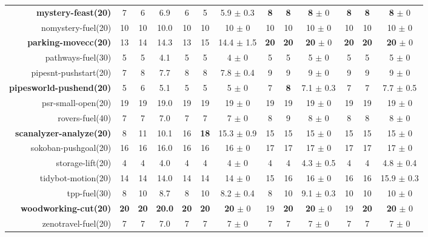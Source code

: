 \begin{center}
\begin{tabular}{|r|*{4}{ccc|}}
\textbf{mystery-feast(20)} & 7 & 6 & 6.9 & 6 & 5 & 5.9 \(\pm\) 0.3 & \textbf{8} & \textbf{8} & \textbf{8} \(\pm\) 0 & \textbf{8} & \textbf{8} & \textbf{8} \(\pm\) 0\\
nomystery-fuel(20) & 10 & 10 & 10.0 & 10 & 10 & 10 \(\pm\) 0 & 10 & 10 & 10 \(\pm\) 0 & 10 & 10 & 10 \(\pm\) 0\\
\textbf{parking-movecc(20)} & 13 & 14 & 14.3 & 13 & 15 & 14.4 \(\pm\) 1.5 & \textbf{20} & \textbf{20} & \textbf{20} \(\pm\) 0 & \textbf{20} & \textbf{20} & \textbf{20} \(\pm\) 0\\
pathways-fuel(30) & 5 & 5 & 4.1 & 5 & 5 & 4 \(\pm\) 0 & 5 & 5 & 5 \(\pm\) 0 & 5 & 5 & 5 \(\pm\) 0\\
pipesnt-pushstart(20) & 7 & 8 & 7.7 & 8 & 8 & 7.8 \(\pm\) 0.4 & 9 & 9 & 9 \(\pm\) 0 & 9 & 9 & 9 \(\pm\) 0\\
\textbf{pipesworld-pushend(20)} & 5 & 6 & 5.1 & 5 & 5 & 5 \(\pm\) 0 & 7 & \textbf{8} & 7.1 \(\pm\) 0.3 & 7 & 7 & 7.7 \(\pm\) 0.5\\
psr-small-open(20) & 19 & 19 & 19.0 & 19 & 19 & 19 \(\pm\) 0 & 19 & 19 & 19 \(\pm\) 0 & 19 & 19 & 19 \(\pm\) 0\\
rovers-fuel(40) & 7 & 7 & 7.0 & 7 & 7 & 7 \(\pm\) 0 & 8 & 9 & 8 \(\pm\) 0 & 8 & 8 & 8 \(\pm\) 0\\
\textbf{scanalyzer-analyze(20)} & 8 & 11 & 10.1 & 16 & \textbf{18} & 15.3 \(\pm\) 0.9 & 15 & 15 & 15 \(\pm\) 0 & 15 & 15 & 15 \(\pm\) 0\\
sokoban-pushgoal(20) & 16 & 16 & 16.0 & 16 & 16 & 16 \(\pm\) 0 & 17 & 17 & 17 \(\pm\) 0 & 17 & 17 & 17 \(\pm\) 0\\
storage-lift(20) & 4 & 4 & 4.0 & 4 & 4 & 4 \(\pm\) 0 & 4 & 4 & 4.3 \(\pm\) 0.5 & 4 & 4 & 4.8 \(\pm\) 0.4\\
tidybot-motion(20) & 14 & 14 & 14.0 & 14 & 14 & 14 \(\pm\) 0 & 15 & 16 & 16 \(\pm\) 0 & 16 & 16 & 15.9 \(\pm\) 0.3\\
tpp-fuel(30) & 8 & 10 & 8.7 & 8 & 10 & 8.2 \(\pm\) 0.4 & 8 & 10 & 9.1 \(\pm\) 0.3 & 10 & 10 & 10 \(\pm\) 0\\
\textbf{woodworking-cut(20)} & \textbf{20} & \textbf{20} & \textbf{20.0} & \textbf{20} & \textbf{20} & \textbf{20} \(\pm\) 0 & 19 & \textbf{20} & \textbf{20} \(\pm\) 0 & 19 & \textbf{20} & \textbf{20} \(\pm\) 0\\
zenotravel-fuel(20) & 7 & 7 & 7.0 & 7 & 7 & 7 \(\pm\) 0 & 7 & 7 & 7 \(\pm\) 0 & 7 & 7 & 7 \(\pm\) 0\\
\end{tabular}
\end{center}

